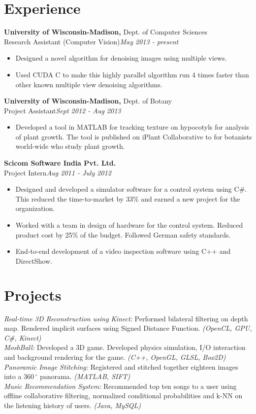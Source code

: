 \documentclass[margin]{res}
\begin{document}
\begin{resume}
\section{Experience}
 {\bf University of Wisconsin-Madison,} Dept. of Computer Sciences \\
Research Assistant (Computer Vision)\hfill {\it May 2013 - present}
 \begin{itemize} \itemsep -2pt  %
 \item Designed a novel algorithm for denoising images using multiple views.
 \item Used CUDA C to make this highly parallel algorithm run 4 times faster than other known multiple view denoising algorithms. 
 \end{itemize}

  {\bf University of Wisconsin-Madison,} Dept. of Botany \\
Project Assistant\hfill {\it Sept 2012 - Aug 2013}
 \begin{itemize} \itemsep -2pt  %
 \item Developed a tool in MATLAB for tracking texture on hypocotyls for analysis of plant growth. The tool is published on iPlant Collaborative to for botanists world-wide who study plant growth.
 \end{itemize}
  {\bf Scicom Software India Pvt. Ltd.} \\
Project Intern\hfill{\it Aug 2011 - July 2012}
 \begin{itemize} \itemsep -2pt  %
 \item Designed and developed a simulator software for a control system using C\#. This reduced the time-to-market by 33\% and earned a new project for the organization.
 \item Worked with a team in design of hardware for the control system. Reduced product cost by 25\% of the budget. Followed German safety standards. 
 \item End-to-end development of a video inspection software using C++ and DirectShow.
 \end{itemize}
\section{Projects}
{\it Real-time 3D Reconstruction using Kinect:} Performed bilateral filtering on depth map. Rendered implicit surfaces using Signed Distance Function. {\it(OpenCL, GPU, C\#, Kinect)}
\\{\it MoshBall:} Developed a 3D game. Developed physics simulation, I/O interaction and background rendering for the game. {\it (C++, OpenGL, GLSL, Box2D)}  
\\{\it Panoramic Image Stitching:} Registered and stitched together eighteen images into a $360\,^{\circ}$ panorama. {\it (MATLAB, SIFT)}
\\{\it Music Recommendation System:} Recommended top ten songs to a user using offline collaborative filtering, normalized conditional probabilities and k-NN on the listening history of users. {\it (Java, MySQL)}


\end{resume}
\end{document}
